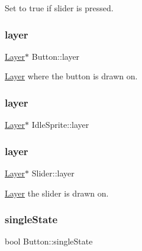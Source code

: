 Set to true if slider is pressed. 

\mbox{\label{group__sprite_ga76e365a5ffde4b0759c8bbd1cc7b932c}} 
\subsubsection{\texorpdfstring{layer}{layer}\hspace{0.1cm}{\footnotesize\ttfamily [1/3]}}
{\footnotesize\ttfamily \mbox{\hyperlink{struct_layer}{Layer}}$\ast$ Button\+::layer}



\mbox{\hyperlink{struct_layer}{Layer}} where the button is drawn on. 

\mbox{\label{group__sprite_ga30536ca9bdfd98e84322bb2275f59d1a}} 
\subsubsection{\texorpdfstring{layer}{layer}\hspace{0.1cm}{\footnotesize\ttfamily [2/3]}}
{\footnotesize\ttfamily \mbox{\hyperlink{struct_layer}{Layer}}$\ast$ Idle\+Sprite\+::layer}

\mbox{\label{group__sprite_gaed3e78bd2a3a88c5b0a02ff128d8dd85}} 
\subsubsection{\texorpdfstring{layer}{layer}\hspace{0.1cm}{\footnotesize\ttfamily [3/3]}}
{\footnotesize\ttfamily \mbox{\hyperlink{struct_layer}{Layer}}$\ast$ Slider\+::layer}



\mbox{\hyperlink{struct_layer}{Layer}} the slider is drawn on. 

\mbox{\label{group__sprite_ga582e96a8182496689178c543a86d3401}} 
\subsubsection{\texorpdfstring{single\+State}{singleState}}
{\footnotesize\ttfamily bool Button\+::single\+State}



